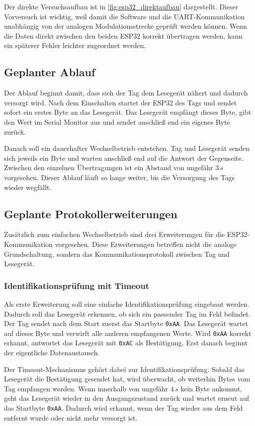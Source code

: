 Der direkte Versuchsaufbau ist in \cref{fig:esp32_direktaufbau} dargestellt. Dieser Vorversuch ist wichtig, weil damit die Software und die UART-Kommunikation unabhängig von der analogen Modulationsstrecke geprüft werden können. Wenn die Daten direkt zwischen den beiden ESP32 korrekt übertragen werden, kann ein späterer Fehler leichter zugeordnet werden.

\subsection{Geplanter Ablauf}
Der Ablauf beginnt damit, dass sich der Tag dem Lesegerät nähert und dadurch versorgt wird. Nach dem Einschalten startet der ESP32 des Tags und sendet sofort ein erstes Byte an das Lesegerät. Das Lesegerät empfängt dieses Byte, gibt den Wert im Serial Monitor aus und sendet anschließ end ein eigenes Byte zurück.

Danach soll ein dauerhafter Wechselbetrieb entstehen. Tag und Lesegerät senden sich jeweils ein Byte und warten anschließ end auf die Antwort der Gegenseite. Zwischen den einzelnen Übertragungen ist ein Abstand von ungefähr $3\,s$ vorgesehen. Dieser Ablauf läuft so lange weiter, bis die Versorgung des Tags wieder wegfällt.

\subsection{Geplante Protokollerweiterungen}
Zusätzlich zum einfachen Wechselbetrieb sind drei Erweiterungen für die ESP32-Kommunikation vorgesehen. Diese Erweiterungen betreffen nicht die analoge Grundschaltung, sondern das Kommunikationsprotokoll zwischen Tag und Lesegerät.

\subsubsection{Identifikationsprüfung mit Timeout}
Als erste Erweiterung soll eine einfache Identifikationsprüfung eingebaut werden. Dadurch soll das Lesegerät erkennen, ob sich ein passender Tag im Feld befindet. Der Tag sendet nach dem Start zuerst das Startbyte \texttt{0xAA}. Das Lesegerät wartet auf dieses Byte und verwirft alle anderen empfangenen Werte. Wird \texttt{0xAA} korrekt erkannt, antwortet das Lesegerät mit \texttt{0xAC} als Bestätigung. Erst danach beginnt der eigentliche Datenaustausch.

Der Timeout-Mechanismus gehört dabei zur Identifikationsprüfung. Sobald das Lesegerät die Bestätigung gesendet hat, wird überwacht, ob weiterhin Bytes vom Tag empfangen werden. Wenn innerhalb von ungefähr $4\,s$ kein Byte ankommt, geht das Lesegerät wieder in den Ausgangszustand zurück und wartet erneut auf das Startbyte \texttt{0xAA}. Dadurch wird erkannt, wenn der Tag wieder aus dem Feld entfernt wurde oder nicht mehr versorgt ist.


